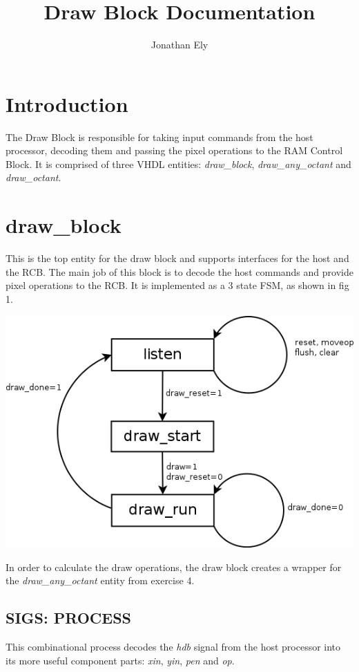 \documentclass[11pt,a4paper]{article}
\title{Draw Block Documentation}
\author{Jonathan Ely}
\begin{document}
\maketitle
\section{Introduction}
The Draw Block is responsible for taking input commands from the host processor,
decoding them and passing the pixel operations to the RAM Control Block.
It is comprised of three VHDL entities: 
\emph{draw\_block}, \emph{draw\_any\_octant} and \emph{draw\_octant}.

\section{draw\_block}
This is the top entity for the draw block and supports interfaces for
the host and the RCB. The main job of this block is to decode the host commands
and provide pixel operations to the RCB. It is implemented as a 3 state FSM,
as shown in fig 1.

\includegraphics[scale=0.5]{drawfsm.png}

In order to calculate the draw operations, the draw block creates a wrapper for 
the \emph{draw\_any\_octant} entity from exercise 4. 

\subsection{SIGS: PROCESS}
This combinational process decodes the \emph{hdb} signal from the host processor
into its more useful component parts: \emph{xin}, \emph{yin}, \emph{pen} and \emph{op}.
\end{document}
